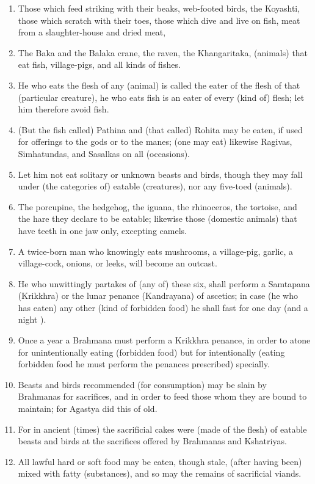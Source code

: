 \begin{enumerate}
\item Those which feed striking with their beaks, web-footed birds, the Koyashti, those which scratch with their toes, those which dive and live on fish, meat from a slaughter-house and dried meat,
\item The Baka and the Balaka crane, the raven, the Khangaritaka, (animals) that eat fish, village-pigs, and all kinds of fishes.
\item He who eats the flesh of any (animal) is called the eater of the flesh of that (particular creature), he who eats fish is an eater of every (kind of) flesh; let him therefore avoid fish.
\item (But the fish called) Pathina and (that called) Rohita may be eaten, if used for offerings to the gods or to the manes; (one may eat) likewise Ragivas, Simhatundas, and Sasalkas on all (occasions).
\item Let him not eat solitary or unknown beasts and birds, though they may fall under (the categories of) eatable (creatures), nor any five-toed (animals).
\item The porcupine, the hedgehog, the iguana, the rhinoceros, the tortoise, and the hare they declare to be eatable; likewise those (domestic animals) that have teeth in one jaw only, excepting camels.
\item A twice-born man who knowingly eats mushrooms, a village-pig, garlic, a village-cock, onions, or leeks, will become an outcast.
\item He who unwittingly partakes of (any of) these six, shall perform a Samtapana (Krikkhra) or the lunar penance (Kandrayana) of ascetics; in case (he who has eaten) any other (kind of forbidden food) he shall fast for one day (and a night ).
\item Once a year a Brahmana must perform a Krikkhra penance, in order to atone for unintentionally eating (forbidden food) but for intentionally (eating forbidden food he must perform the penances prescribed) specially.
\item Beasts and birds recommended (for consumption) may be slain by Brahmanas for sacrifices, and in order to feed those whom they are bound to maintain; for Agastya did this of old.
\item For in ancient (times) the sacrificial cakes were (made of the flesh) of eatable beasts and birds at the sacrifices offered by Brahmanas and Kshatriyas.
\item All lawful hard or soft food may be eaten, though stale, (after having been) mixed with fatty (substances), and so may the remains of sacrificial viands.

\end{enumerate}
